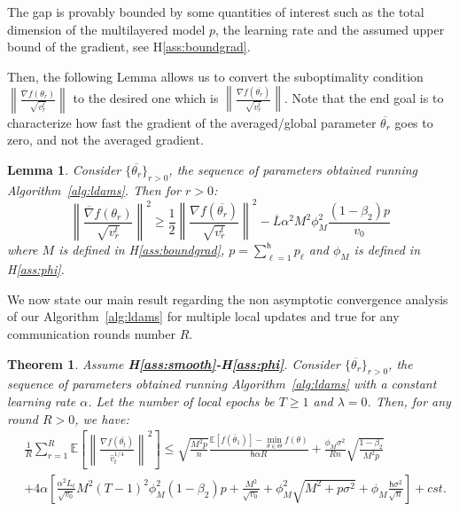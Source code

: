 \documentclass[11pt]{article}
\newtheorem{Lemma}{Lemma}
\newtheorem{Theorem}{Theorem}
\newcommand{\beq}{\begin{equation}}
\newcommand{\eeq}{\end{equation}}
\def\EE{\mathbb{E}}
\def\tot{\mathsf{h}}
\begin{document}
The gap is provably bounded by some quantities of interest such as the total dimension of the multilayered model $p$, the learning rate and the assumed upper bound of the  gradient, see H\ref{ass:boundgrad}.

Then, the following Lemma allows us to convert the suboptimality condition $\left\| \frac{\overline{\nabla}f(\theta_r)}{\sqrt{ v_r^t}} \right\|$ to the desired one which is $\left\| \frac{\nabla f(\overline{\theta_r})}{\sqrt{ v_r^t}} \right\|$.
Note that the end goal is to characterize how fast the gradient of the averaged/global parameter $\overline{\theta_r}$ goes to zero, and not the averaged gradient.

\begin{Lemma}\label{lemma:ratio}
Consider $\{\overline{\theta_r}\}_{r>0}$, the sequence of parameters obtained running Algorithm~\ref{alg:ldams}. Then for $r > 0$:
\beq
\left\| \frac{\overline{\nabla}f(\theta_r)}{\sqrt{ v_r^t}} \right\|^2 \geq \frac{1}{2} \left\| \frac{\nabla f(\overline{\theta_r})}{\sqrt{ v_r^t}} \right\|^2 - \overline{L} \alpha^2 M^2 \phi_M^2 \frac{(1-\beta_2)p}{v_0}
\eeq
where $M$ is defined in H\ref{ass:boundgrad}, $p = \sum_{\ell = 1}^\tot p_\ell$ and $\phi_M$ is defined in H\ref{ass:phi}.
\end{Lemma}


We now state our main result regarding the non asymptotic convergence analysis of our Algorithm~\ref{alg:ldams} for multiple local updates and true for any communication rounds number $R$.
\begin{Theorem}\label{th:multiple update}
Assume \textbf{H\ref{ass:smooth}-H\ref{ass:phi}}. Consider $\{\overline{\theta_r}\}_{r>0}$, the sequence of parameters obtained running Algorithm~\ref{alg:ldams} with a constant learning rate $\alpha$. Let the number of local epochs be $T \geq 1$ and $\lambda = 0$. Then, for any round $R > 0$, we have:
\beq \label{bound1multiple}
\begin{split}
&  \frac{1}{R}\sum_{r=1}^R  \EE\left[ \left\| \frac{\nabla f(\overline{\theta_t})}{\hat v_t^{1/4}}   \right \|^2 \right] \leq    \sqrt{\frac{M^2 p}{n}}  \frac{ \EE[f(\bar{\theta}_1)]  - \min \limits_{\theta \in \Theta} f(\theta)}{\tot \alpha R} +      \frac{\phi_M   \sigma^2}{R n} \sqrt{\frac{1 - \beta_2}{M^2 p}  } \\
    &   +4\alpha \left[ \frac{\alpha^2 L_\ell}{\sqrt{v_0}} M^2 (T-1)^2 \phi_M^2 (1-\beta_2)p + \frac{M^2}{\sqrt{v_0}}+\phi_M^2\sqrt{M^2+p\sigma^2} + \phi_M \frac{\tot \sigma^2}{\sqrt{n}}\right]   + cst. \\
   \end{split}
\eeq

\end{Theorem}
\end{document}
